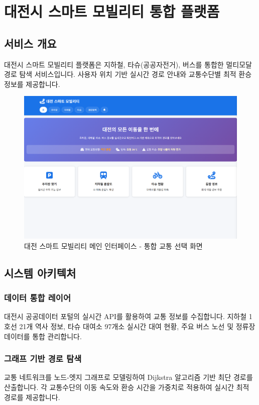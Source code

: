 \section{대전시 스마트 모빌리티 통합 플랫폼}

\subsection{서비스 개요}
대전시 스마트 모빌리티 플랫폼은 지하철, 타슈(공공자전거), 버스를 통합한 멀티모달 경로 탐색 서비스입니다. 사용자 위치 기반 실시간 경로 안내와 교통수단별 최적 환승 정보를 제공합니다.

\begin{figure}[h]
    \includegraphics[width=\columnwidth]{2/daejeon-1.png}
    \caption{대전 스마트 모빌리티 메인 인터페이스 - 통합 교통 선택 화면}
    \label{fig:main_interface}
\end{figure}

\subsection{시스템 아키텍처}

\subsubsection{데이터 통합 레이어}
대전시 공공데이터 포털의 실시간 API를 활용하여 교통 정보를 수집합니다. 지하철 1호선 21개 역사 정보, 타슈 대여소 97개소 실시간 대여 현황, 주요 버스 노선 및 정류장 데이터를 통합 관리합니다.

\subsubsection{그래프 기반 경로 탐색}
교통 네트워크를 노드-엣지 그래프로 모델링하여 Dijkstra 알고리즘 기반 최단 경로를 산출합니다. 각 교통수단의 이동 속도와 환승 시간을 가중치로 적용하여 실시간 최적 경로를 제공합니다.

